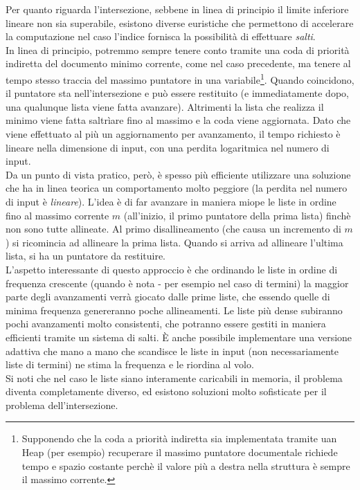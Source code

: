 Per quanto riguarda l'intersezione, sebbene in linea di principio il limite inferiore lineare non sia superabile, esistono diverse euristiche che permettono di accelerare la computazione nel caso l'indice fornisca la possibilità di effettuare \textit{salti}.\\
In linea di principio, potremmo sempre tenere conto tramite una coda di priorità indiretta del documento minimo corrente, come nel caso precedente, ma tenere al tempo stesso traccia del massimo puntatore in una variabile\footnote{Supponendo che la coda a priorità indiretta sia implementata tramite uan Heap (per esempio) recuperare il massimo puntatore documentale richiede tempo e spazio costante perchè il valore più a destra nella struttura è sempre il massimo corrente.}. Quando coincidono, il puntatore sta nell'intersezione e può essere restituito (e immediatamente dopo, una qualunque lista viene fatta avanzare). Altrimenti la lista che realizza il minimo viene fatta saltrìare fino al massimo e la coda viene aggiornata. Dato che viene effettuato al più un aggiornamento per avanzamento, il tempo richiesto è lineare nella dimensione di input, con una perdita logaritmica nel numero di input.\\
Da un punto di vista pratico, però, è spesso più efficiente utilizzare una soluzione che ha in linea teorica un comportamento molto peggiore (la perdita nel numero di input è \textit{lineare}). L'idea è di far avanzare in maniera miope le liste in ordine fino al massimo corrente $m$ (all'inizio, il primo puntatore della prima lista) finchè non sono tutte allineate. Al primo disallineamento (che causa un incremento di $m$) si ricomincia ad allineare la prima lista. Quando si arriva ad allineare l'ultima lista, si ha un puntatore da restituire.\\
L'aspetto interessante di questo approccio è che ordinando le liste in ordine di frequenza crescente (quando è nota - per esempio nel caso di termini) la maggior parte degli avanzamenti verrà giocato dalle prime liste, che essendo quelle di minima frequenza genereranno poche allineamenti. Le liste più dense subiranno pochi avanzamenti molto consistenti, che potranno essere gestiti in maniera efficienti tramite un sistema di salti. È anche possibile implementare una versione adattiva che mano a mano che scandisce le liste in input (non necessariamente liste di termini) ne stima la frequenza e le riordina al volo.\\
Si noti che nel caso le liste siano interamente caricabili in memoria, il problema diventa completamente diverso, ed esistono soluzioni molto sofisticate per il problema dell'intersezione. %
